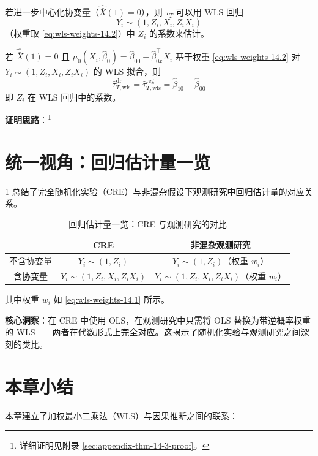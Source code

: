 若进一步中心化协变量（$\hat{\bar{X}}(1)=0$），则 $\tau_T$ 可以用 WLS 回归
\[
Y_i \sim (1, Z_i, X_i, Z_i X_i)
\]
（权重取 \cref{eq:wls-weights-14.2}）中 $Z_i$ 的系数来估计。

\begin{Theorem}[定理 14.3 — 处理组的双重稳健性]\label{chap14-thm:double-robust-treated}
若 $\hat{\bar{X}}(1)=0$ 且 $\mu_0(X_i, \hat{\beta}_0) = \hat{\beta}_{00} + \hat{\beta}_{0x}^\top X_i$ 基于权重 \cref{eq:wls-weights-14.2} 对 $Y_i \sim (1, Z_i, X_i, Z_i X_i)$ 的 WLS 拟合，则
\[
\hat{\tau}_{T,\text{wls}}^{\text{dr}}
= \hat{\tau}_{T,\text{wls}}^{\text{reg}}
= \hat{\beta}_{10} - \hat{\beta}_{00}
\]
即 $Z_i$ 在 WLS 回归中的系数。
\end{Theorem}

\textbf{证明思路}：\footnote{详细证明见附录 \cref{sec:appendix-thm-14-3-proof}。}

\section{统一视角：回归估计量一览}\label{sec:14-5}

\cref{tab:14-1} 总结了完全随机化实验（CRE）与非混杂假设下观测研究中回归估计量的对应关系。

\begin{table}[htbp]
\caption{回归估计量一览：CRE 与观测研究的对比}\label{tab:14-1}
\begin{center}
\begin{tabular}{ccc}
\hline
 & CRE & 非混杂观测研究 \\ \hline
不含协变量 & $Y_i \sim (1, Z_i)$ & $Y_i \sim (1, Z_i)$（权重 $w_i$）\\
含协变量 & $Y_i \sim (1, Z_i, X_i, Z_i X_i)$ & $Y_i \sim (1, Z_i, X_i, Z_i X_i)$（权重 $w_i$）\\ \hline
\end{tabular}
\end{center}
\end{table}

其中权重 $w_i$ 如 \cref{eq:wls-weights-14.1} 所示。

\textbf{核心洞察}：在 CRE 中使用 OLS，在观测研究中只需将 OLS 替换为带逆概率权重的 WLS——两者在代数形式上完全对应。这揭示了随机化实验与观测研究之间深刻的类比。

\section{本章小结}\label{sec:14-summary}

本章建立了加权最小二乘法（WLS）与因果推断之间的联系：

